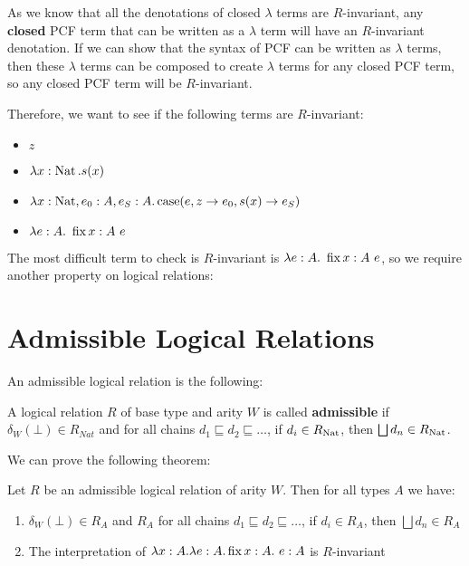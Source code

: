 As we know that all the denotations of closed $\lambda$ terms are $R$-invariant, any \textbf{closed} PCF term that can be written as a $\lambda$ term will have  an $R$-invariant denotation. If we can show that the syntax of PCF can be written as $\lambda$ terms, then these $\lambda$ terms can be composed to create $\lambda$ terms for any closed PCF term, so any closed PCF term will be $R$-invariant.

Therefore, we want to see if the following terms are $R$-invariant:

\begin{itemize}
\item{$z$}
\item{$\lambda x: \operatorname{Nat}. s(x)$}
\item{$\lambda x: \operatorname{Nat}, e_0 : A, e_S: A. \operatorname{case}(e,z \to e_0,s(x) \to e_S)$}
\item{$\lambda e: A . \ \fix x:A \ e $}
\end{itemize} 

The most difficult term to check is $R$-invariant is $\lambda e: A . \ \fix x:A \ e $, so we require another property on logical relations:

\section{Admissible Logical Relations}

An admissible logical relation is the following:

\vspace{0.5cm}

\begin{defn}
A logical relation $R$ of base type and arity $W$ is called \textbf{admissible} if $\delta_W(\bot) \in R_{Nat}$ and for all chains $d_1 \sqsubseteq d_2 \sqsubseteq \dots$, if  $d_i \in R_{\operatorname{Nat}}$, then $\bigsqcup d_n \in R_{\operatorname{Nat}}$.
\end{defn}


We can prove the following theorem:

\vspace{0.5cm}

\begin{thm}
Let $R$ be an admissible logical relation of arity $W$. Then for all types $A$ we have:

\begin{enumerate}
\item{$\delta_W(\bot) \in R_A$ and $R_A$ for all chains $d_1 \sqsubseteq d_2 \sqsubseteq \dots$, if  $d_i \in R_A$, then $\bigsqcup d_n \in R_A$}
\item{The interpretation of $\lambda x : A. \lambda e : A. \operatorname{fix} x : A. \ e : A$ is $R$-invariant}
\end{enumerate}
\end{thm}

